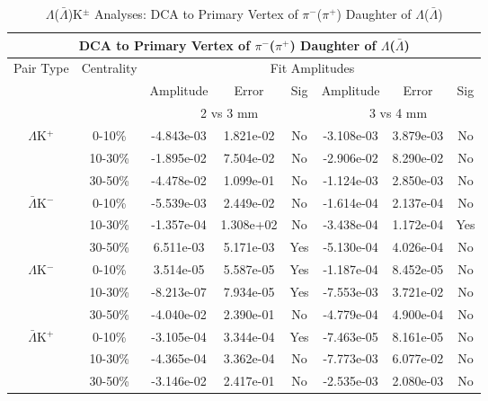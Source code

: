 \documentclass[../AnalysisNoteJBuxton.tex]{subfiles}
\begin{document}



\begin{table}
 \centering
 \begin{tabular}{|c|c|c|c|c||c|c|c|}
  \multicolumn{8}{c}{DCA to Primary Vertex of $\pi^{-}$($\pi^{+}$) Daughter of $\Lambda$($\bar{\Lambda}$)} \\
  \hline
  \multirow{3}{*}{Pair Type} & \multirow{3}{*}{Centrality} & \multicolumn{6}{c|}{Fit Amplitudes} \\
  \cline{3-8}
   & & Amplitude & Error & Sig & Amplitude & Error & Sig \\  
  \cline{3-8}
   & & \multicolumn{3}{c||}{2 vs 3 mm} & \multicolumn{3}{c|}{3 vs 4 mm} \\  
  \hline
  \multirow{3}{*}{$\Lambda$K$^{+}$}
   &  0-10\% & -4.843e-03 & 1.821e-02 & No & -3.108e-03 & 3.879e-03 & No \\
   & 10-30\% & -1.895e-02 & 7.504e-02 & No & -2.906e-02 & 8.290e-02 & No \\
   & 30-50\% & -4.478e-02 & 1.099e-01 & No & -1.124e-03 & 2.850e-03 & No \\
  \hline
  \multirow{3}{*}{$\bar{\Lambda}$K$^{-}$}
   &  0-10\% & -5.539e-03 & 2.449e-02 & No & -1.614e-04 & 2.137e-04 & No \\
   & 10-30\% & -1.357e-04 & 1.308e+02 & No & -3.438e-04 & 1.172e-04 & Yes \\
   & 30-50\% & 6.511e-03 & 5.171e-03 & Yes & -5.130e-04 & 4.026e-04 & No \\
  \hline \hline
  \multirow{3}{*}{$\Lambda$K$^{-}$}
   &  0-10\% & 3.514e-05 & 5.587e-05 & Yes & -1.187e-04 & 8.452e-05 & No \\
   & 10-30\% & -8.213e-07 & 7.934e-05 & Yes & -7.553e-03 & 3.721e-02 & No \\
   & 30-50\% & -4.040e-02 & 2.390e-01 & No & -4.779e-04 & 4.900e-04 & No \\
  \hline
  \multirow{3}{*}{$\bar{\Lambda}$K$^{+}$}
   &  0-10\% & -3.105e-04 & 3.344e-04 & Yes & -7.463e-05 & 8.161e-05 & No \\
   & 10-30\% & -4.365e-04 & 3.362e-04 & No & -7.773e-03 & 6.077e-02 & No \\
   & 30-50\% & -3.146e-02 & 2.417e-01 & No & -2.535e-03 & 2.080e-03 & No \\
  \hline
 \end{tabular}
 \caption{$\Lambda$($\bar{\Lambda}$)K$^{\pm}$ Analyses: DCA to Primary Vertex of $\pi^{-}$($\pi^{+}$) Daughter of $\Lambda$($\bar{\Lambda}$)}
 \label{tab:DcaToPrimVertexPionDaughtOfLamLamKch}
\end{table}
\end{document}
